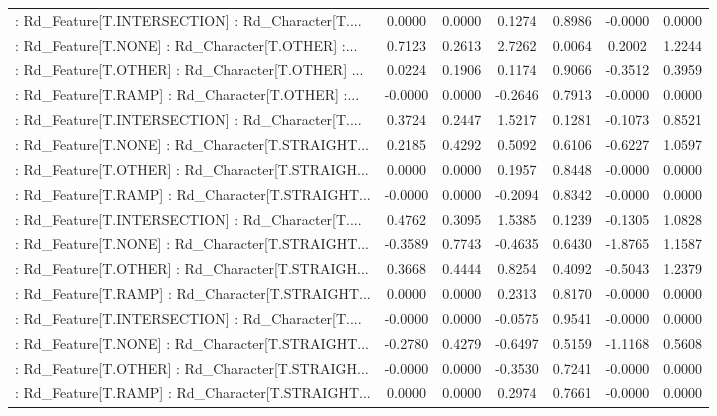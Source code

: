 \begin{longtable}{p{4cm}cccccc}
 : Rd\_Feature[T.INTERSECTION] : Rd\_Character[T.... &  0.0000 &    0.0000 &  0.1274 &       0.8986 & -0.0000 &  0.0000 \\
 : Rd\_Feature[T.NONE] : Rd\_Character[T.OTHER] :... &  0.7123 &    0.2613 &  2.7262 &       0.0064 &  0.2002 &  1.2244 \\
 : Rd\_Feature[T.OTHER] : Rd\_Character[T.OTHER] ... &  0.0224 &    0.1906 &  0.1174 &       0.9066 & -0.3512 &  0.3959 \\
 : Rd\_Feature[T.RAMP] : Rd\_Character[T.OTHER] :... & -0.0000 &    0.0000 & -0.2646 &       0.7913 & -0.0000 &  0.0000 \\
 : Rd\_Feature[T.INTERSECTION] : Rd\_Character[T.... &  0.3724 &    0.2447 &  1.5217 &       0.1281 & -0.1073 &  0.8521 \\
 : Rd\_Feature[T.NONE] : Rd\_Character[T.STRAIGHT... &  0.2185 &    0.4292 &  0.5092 &       0.6106 & -0.6227 &  1.0597 \\
 : Rd\_Feature[T.OTHER] : Rd\_Character[T.STRAIGH... &  0.0000 &    0.0000 &  0.1957 &       0.8448 & -0.0000 &  0.0000 \\
 : Rd\_Feature[T.RAMP] : Rd\_Character[T.STRAIGHT... & -0.0000 &    0.0000 & -0.2094 &       0.8342 & -0.0000 &  0.0000 \\
 : Rd\_Feature[T.INTERSECTION] : Rd\_Character[T.... &  0.4762 &    0.3095 &  1.5385 &       0.1239 & -0.1305 &  1.0828 \\
 : Rd\_Feature[T.NONE] : Rd\_Character[T.STRAIGHT... & -0.3589 &    0.7743 & -0.4635 &       0.6430 & -1.8765 &  1.1587 \\
 : Rd\_Feature[T.OTHER] : Rd\_Character[T.STRAIGH... &  0.3668 &    0.4444 &  0.8254 &       0.4092 & -0.5043 &  1.2379 \\
 : Rd\_Feature[T.RAMP] : Rd\_Character[T.STRAIGHT... &  0.0000 &    0.0000 &  0.2313 &       0.8170 & -0.0000 &  0.0000 \\
 : Rd\_Feature[T.INTERSECTION] : Rd\_Character[T.... & -0.0000 &    0.0000 & -0.0575 &       0.9541 & -0.0000 &  0.0000 \\
 : Rd\_Feature[T.NONE] : Rd\_Character[T.STRAIGHT... & -0.2780 &    0.4279 & -0.6497 &       0.5159 & -1.1168 &  0.5608 \\
 : Rd\_Feature[T.OTHER] : Rd\_Character[T.STRAIGH... & -0.0000 &    0.0000 & -0.3530 &       0.7241 & -0.0000 &  0.0000 \\
 : Rd\_Feature[T.RAMP] : Rd\_Character[T.STRAIGHT... &  0.0000 &    0.0000 &  0.2974 &       0.7661 & -0.0000 &  0.0000 \\

\end{longtable}
